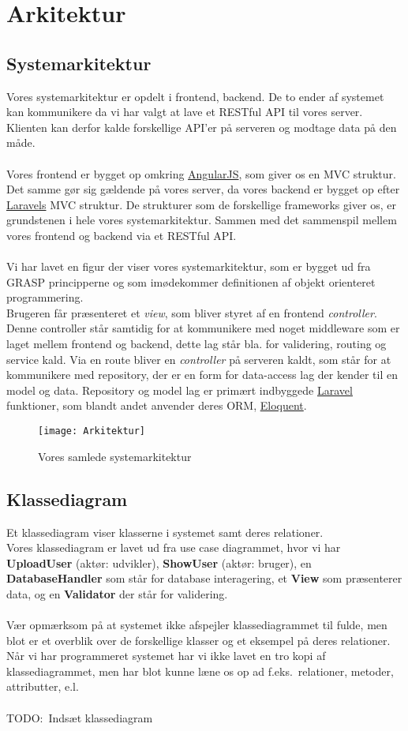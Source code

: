 \section{Arkitektur}
\subsection{Systemarkitektur}
Vores systemarkitektur er opdelt i frontend, backend.
De to ender af systemet kan kommunikere da vi har valgt at lave et RESTful API til vores server.
Klienten kan derfor kalde forskellige API'er på serveren og modtage data på den måde.
\\\\
Vores frontend er bygget op omkring \hyperlink{AngularJS}{AngularJS}, som giver os en MVC struktur.
Det samme gør sig gældende på vores server, da vores backend er bygget op efter \hyperlink{Laravel}{Laravels} MVC struktur.
De strukturer som de forskellige frameworks giver os, er grundstenen i hele vores systemarkitektur. Sammen med det sammenspil mellem vores frontend og backend via et RESTful API.\@
\\\\
Vi har lavet en figur der viser vores systemarkitektur, som er bygget ud fra GRASP principperne og som imødekommer definitionen af objekt orienteret programmering.\\
Brugeren får præsenteret et \textit{view}, som bliver styret af en frontend \textit{controller}. Denne controller står samtidig for at kommunikere med noget middleware som er laget mellem frontend og backend, dette lag står bla. for validering, routing og service kald. Via en route bliver en \textit{controller} på serveren kaldt, som står for at kommunikere med repository, der er en form for data-access lag der kender til en model og data. Repository og model lag er primært indbyggede \hyperlink{Laravel}{Laravel} funktioner, som blandt andet anvender deres ORM, \href{http://laravel.com/docs/5.1/eloquent}{Eloquent}.
\begin{figure}[here]
\texttt{[image: Arkitektur]}
\caption{Vores samlede systemarkitektur}
\label{fig:arkitektur}
\end{figure}
\subsection{Klassediagram}
Et klassediagram viser klasserne i systemet samt deres relationer.\\
Vores klassediagram er lavet ud fra use case diagrammet, hvor vi har \textbf{UploadUser} (aktør: udvikler), \textbf{ShowUser} (aktør: bruger), en \textbf{DatabaseHandler} som står for database interagering, et \textbf{View} som præsenterer data, og en \textbf{Validator} der står for validering.
\\\\
Vær opmærksom på at systemet ikke afspejler klassediagrammet til fulde, men blot er et overblik over de forskellige klasser og et eksempel på deres relationer.
Når vi har programmeret systemet har vi ikke lavet en tro kopi af klassediagrammet, men har blot kunne læne os op ad f.eks.\
relationer, metoder, attributter, e.l.
\\\\
TODO:\ Indsæt klassediagram
